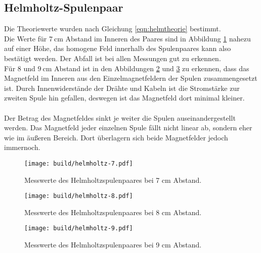 \subsection{Helmholtz-Spulenpaar}
Die Theoriewerte wurden nach Gleichung \ref{eqn:helmtheorie} bestimmt.\\
Die Werte für $\SI{7}{\centi\metre}$ Abstand im Inneren des Paares sind in
Abbildung \ref{fig:helm7} nahezu auf einer Höhe,
das homogene Feld innerhalb des Spulenpaares kann also bestätigt werden.
Der Abfall ist bei allen Messungen gut zu erkennen.
\\
Für 8 und $\SI{9}{\centi\metre}$ Abstand ist in den Abbildungen \ref{fig:helm8}
und \ref{fig:helm9} zu erkennen, dass das Magnetfeld im
Inneren aus den Einzelmagnetfeldern der Spulen zusammengesetzt ist.
Durch Innenwiderstände der Drähte und Kabeln ist die Stromstärke zur zweiten Spule
hin gefallen, deswegen ist das Magnetfeld dort minimal kleiner.
\\\\
Der Betrag des Magnetfeldes sinkt je weiter die Spulen auseinandergestellt werden.
Das Magnetfeld jeder einzelnen Spule fällt nicht linear ab,
sondern eher wie im äußeren Bereich.
Dort überlagern sich beide Magnetfelder jedoch immernoch.
\begin{figure}
      \centering
      \texttt{[image: build/helmholtz-7.pdf]}
      \caption{Messwerte des Helmholtzspulenpaares bei 7 cm Abstand.}
      \label{fig:helm7}
\end{figure}
\begin{figure}
      \centering
      \texttt{[image: build/helmholtz-8.pdf]}
      \caption{Messwerte des Helmholtzspulenpaares bei 8 cm Abstand.}
      \label{fig:helm8}
\end{figure}
\begin{figure}
      \centering
      \texttt{[image: build/helmholtz-9.pdf]}
      \caption{Messwerte des Helmholtzspulenpaares bei 9 cm Abstand.}
      \label{fig:helm9}
\end{figure}

